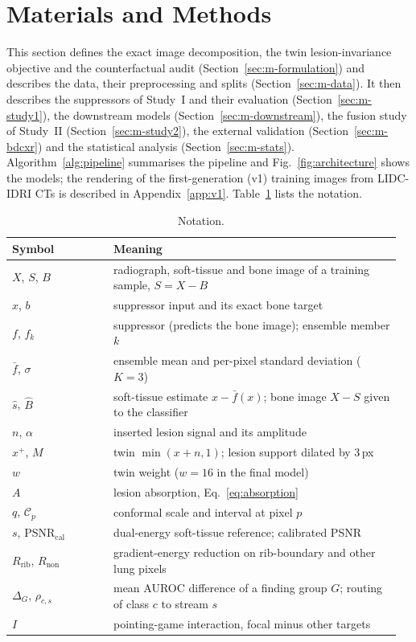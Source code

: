\section{Materials and Methods}
\label{sec:methods}
This section defines the exact image decomposition, the twin lesion-invariance objective and the counterfactual audit
(Section~\ref{sec:m-formulation}) and describes the data, their preprocessing and splits (Section~\ref{sec:m-data}). It then describes
the suppressors of Study~I and their evaluation (Section~\ref{sec:m-study1}), the downstream models (Section~\ref{sec:m-downstream}), the
fusion study of Study~II (Section~\ref{sec:m-study2}), the external validation (Section~\ref{sec:m-bdcxr}) and the statistical analysis
(Section~\ref{sec:m-stats}). Algorithm~\ref{alg:pipeline} summarises the pipeline and Fig.~\ref{fig:architecture} shows the models; the
rendering of the first-generation (v1) training images from LIDC-IDRI CTs is described in Appendix~\ref{app:v1}. Table~\ref{tab:notation}
lists the notation.

\begin{table}[!t]
\centering
\caption{Notation.}
\label{tab:notation}
\footnotesize
\renewcommand{\arraystretch}{1.08}
\setlength{\tabcolsep}{3pt}
\begin{tabular}{@{}>{\raggedright\arraybackslash}p{0.25\linewidth}>{\raggedright\arraybackslash}p{0.71\linewidth}@{}}
\toprule
Symbol & Meaning \\
\midrule
$X$, $S$, $B$ & radiograph, soft-tissue and bone image of a training sample, $S=X-B$ \\
$x$, $b$ & suppressor input and its exact bone target \\
$f$, $f_k$ & suppressor (predicts the bone image); ensemble member $k$ \\
$\bar f$, $\sigma$ & ensemble mean and per-pixel standard deviation ($K=3$) \\
$\hat s$, $\hat B$ & soft-tissue estimate $x-\bar f(x)$; bone image $X-S$ given to the classifier \\
$n$, $\alpha$ & inserted lesion signal and its amplitude \\
$x^{+}$, $M$ & twin $\min(x+n,1)$; lesion support dilated by 3\,px \\
$w$ & twin weight ($w=16$ in the final model) \\
$A$ & lesion absorption, Eq.~\eqref{eq:absorption} \\
$q$, $\mathcal{C}_p$ & conformal scale and interval at pixel $p$ \\
$s$, PSNR$_{\mathrm{cal}}$ & dual-energy soft-tissue reference; calibrated PSNR \\
$R_{\mathrm{rib}}$, $R_{\mathrm{non}}$ & gradient-energy reduction on rib-boundary and other lung pixels \\
$\Delta_G$, $\rho_{c,s}$ & mean AUROC difference of a finding group $G$; routing of class $c$ to stream $s$ \\
$I$ & pointing-game interaction, focal minus other targets \\
\bottomrule
\end{tabular}
\end{table}

